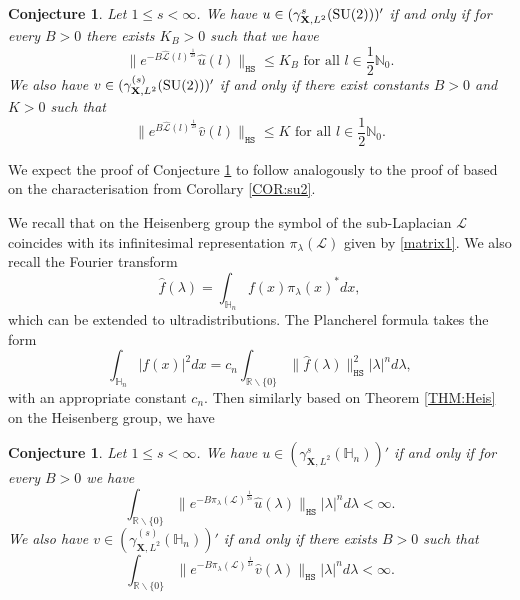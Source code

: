 \documentclass[12pt,oneside,a4paper]{book}
\numberwithin{equation}{section}     %
\theoremstyle{plain}
\newtheorem{conj}[theorem]{Conjecture}
\theoremstyle{definition}
\newcommand{\N}{{\mathbb N}}
\newcommand{\R}{{\mathbb R}}
\newcommand{\slp}{{\mathcal L}}
\newcommand{\HS}{{\mathtt{HS}}}
\newcommand{\SU}{{\rm SU(2)}}
\begin{document}
\begin{conj}\label{THM:ultra-su2}
	Let $1\leq s<\infty$. We have $u\in (\gamma^{s}_{\mathbf{X}, L^2}(\SU))'$ if and only if for every $B>0$ there exists $K_B>0$ such that we have
	\begin{equation}\label{EQ:u-su2}
	\|e^{-B \widehat{\slp}(l)^{\frac{1}{2s}}}\widehat{u}(l)\|_{\HS}\leq K_B  \textrm{ for all } l\in\frac12\N_0.
	\end{equation}
	We also have $v\in (\gamma^{(s)}_{\mathbf{X}, L^2}(\SU))'$ if and only if there exist constants $B>0$ and $K>0$ such that
	\begin{equation}\label{EQ:u-su2-b}
	\|e^{B\widehat{\slp}(l)^{\frac{1}{2s}}} \widehat{v}(l)\|_{\HS}\leq K  \textrm{ for all } l\in\frac12\N_0.
	\end{equation}
\end{conj}
We expect the proof of Conjecture \ref{THM:ultra-su2} to follow analogously to the proof of \cite[Theorem 2.5]{DR2014} based on the characterisation from Corollary \ref{COR:su2}.

We recall that on the Heisenberg group the symbol of the sub-Laplacian $\slp$ coincides with its infinitesimal representation $\pi_\lambda(\slp)$ given by \eqref{matrix1}. We also recall the Fourier transform $$\widehat{f}(\lambda)=\int_{\mathbb H_n} f(x)\pi_\lambda(x)^* dx,$$ which can be extended to ultradistributions. 
The Plancherel formula takes the form
$$
\int_{\mathbb H_n} |f(x)|^2 dx=c_n\int_{\R\backslash\{0\}} \|\widehat{f}(\lambda)\|_{\HS}^2 |\lambda|^n d\lambda,
$$
with an appropriate constant $c_n$.
Then similarly based on Theorem \ref{THM:Heis} on the Heisenberg group, we have 

\begin{conj}\label{THM:ultra-Hn}
	Let $1\leq s<\infty$. We have $u\in (\gamma^{s}_{\mathbf{X}, L^2}(\mathbb H_n))'$ if and only if for every $B>0$ we have
	\begin{equation}\label{EQ:u-Hn}
	\int_{\R\backslash\{0\}}\|e^{-B \pi_\lambda(\slp)^{\frac{1}{2s}}}\widehat{u}(\lambda)\|_{\HS}|\lambda|^n d\lambda <\infty.
	\end{equation}
	We also have $v\in (\gamma^{(s)}_{\mathbf{X}, L^2}(\mathbb H_n))'$ if and only if there exists $B>0$  such that
	\begin{equation}\label{EQ:u-Hn-b}
	\int_{\R\backslash\{0\}}\|e^{-B \pi_\lambda(\slp)^{\frac{1}{2s}}}\widehat{v}(\lambda)\|_{\HS}|\lambda|^n d\lambda <\infty.
	\end{equation}
\end{conj}
\end{document}
